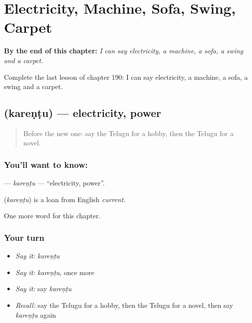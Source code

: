 
\chapter{Electricity, Machine, Sofa, Swing, Carpet}
\label{ch:te-electricity-machine-sofa-swing-carpet}

\begin{chapteropening}
\textbf{By the end of this chapter:} \emph{I can say electricity, a machine, a sofa, a swing and a carpet.}

Complete the last lesson of chapter 190: I can say electricity, a machine, a sofa, a swing and a carpet.
\end{chapteropening}

\section[\texorpdfstring{\te{కరెంటు} (kareṇṭu)}{కరెంటు (kareṇṭu)}]{ (kareṇṭu) — electricity, power}

\label{lesson:TE-C190-karentu}



\begin{quote}
Before the new one: say the Telugu for a hobby, then the Telugu for a novel.
\end{quote}

\subsection*{You'll want to know: }
\textbf{} — \emph{kareṇṭu} — \textquotedblleft{}electricity, power\textquotedblright{}.

\begin{cousinweb}
\textbf{} (\emph{kareṇṭu}) is a loan from English \emph{current}.
\end{cousinweb}

\begin{grammarlens}[title={What you've built}]
One more word for this chapter.
\end{grammarlens}

\subsection*{Your turn}
\begin{itemize}
\raggedright
  \item \emph{Say it:} \emph{kareṇṭu}
  \item \emph{Say it:} \emph{kareṇṭu}, once more
  \item \emph{Say it:} say \emph{kareṇṭu}
  \item \emph{Recall:} say the Telugu for a hobby, then the Telugu for a novel, then say \emph{kareṇṭu} again
\end{itemize}

